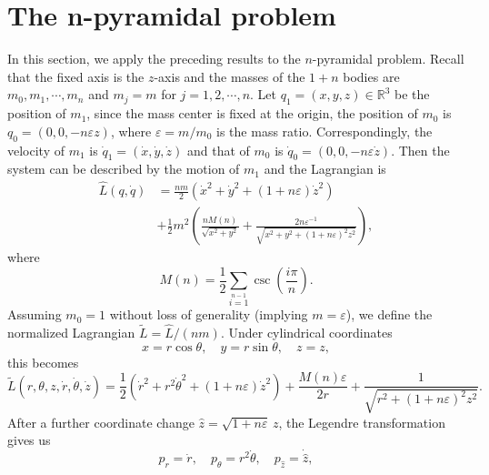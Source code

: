 \documentclass[11pt]{amsart}
\newcommand{\ep}{\varepsilon}
\begin{document}
\section{The n-pyramidal problem}\label{sec:pyramidal}

In this section, we apply the preceding results to the $n$-pyramidal problem. Recall that the fixed axis is the $z$-axis and the masses of the $1+n$ bodies are $m_{0},m_1,\cdots,m_n$ and $m_j=m$ for $j=1,2,\cdots,n$. Let $q_{1}=(x,y,z)\in\mathbb{R}^{3}$ be the position of $m_1$, since the mass center is fixed at the origin, the position of $m_0$ is $q_{0}=(0,0,-n\ep z)$, where $\ep=m\slash m_0$ is the mass ratio. Correspondingly, the velocity of $m_1$ is $\dot{q}_{1}=(\dot{x},\dot{y},\dot{z})$ and that of $m_0$ is $\dot{q}_0=(0,0,-n\ep\dot{z})$. Then the system can be described by the motion of $m_1$ and the Lagrangian is
\begin{equation}
	\begin{aligned}
		\hat{L}(q,\dot{q})&=\frac{nm}{2}(\dot{x}^{2}+\dot{y}^{2}+(1+n\ep)\dot{z}^2)\\
		&+\frac{1}{2}m^{2}\left(\frac{nM(n)}{\sqrt{x^{2}+y^{2}}}+\frac{2n\ep^{-1}}{\sqrt{x^{2}+y^{2}+(1+n\ep)^{2}z^{2}}}\right),
	\end{aligned}
\end{equation}
where 
\begin{equation}
	M(n)=\frac{1}{2}\sum\limits_{i=1}\limits^{n-1}\csc(\frac{i\pi}{n}).%
\end{equation}
Assuming $m_0 = 1$ without loss of generality (implying $m = \ep$), we define the normalized Lagrangian $\tilde{L} = \hat{L}/(nm)$. Under cylindrical coordinates
$$
	x=r\cos\theta,\quad y=r\sin\theta,\quad z=z,
$$
this becomes
\begin{equation*}
	\tilde{L}(r,\theta,z,\dot{r},\dot{\theta},\dot{z})=\frac{1}{2}(\dot{r}^{2}+r^{2}\dot{\theta}^{2}+(1+n\ep)\dot{z}^2)+\frac{M(n)\ep}{2r}+\frac{1}{\sqrt{r^{2}+(1+n\ep)^{2}z^{2}}}.
\end{equation*}
After a further coordinate change $\hat{z} = \sqrt{1+n\ep}\,z$, the Legendre transformation gives us 
\begin{equation*}
	p_{r} = \dot{r}, \quad p_{\theta} = r^2\dot{\theta}, \quad p_{\hat{z}} = \dot{\hat{z}},
\end{equation*}
\end{document}
